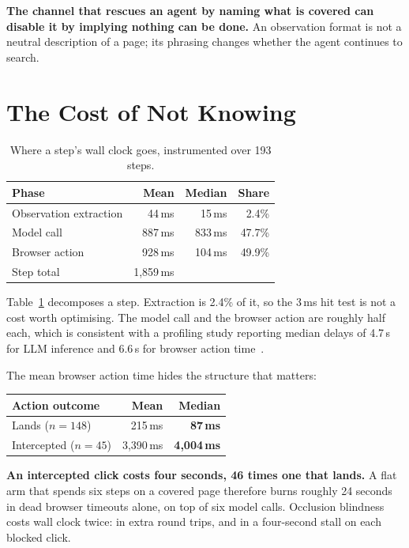 \documentclass[conference]{IEEEtran}
\begin{document}
\textbf{The channel that rescues an agent by naming what is covered can disable
it by implying nothing can be done.} An observation format is not a neutral
description of a page; its phrasing changes whether the agent continues to
search.

\section{The Cost of Not Knowing}
\label{sec:cost}

\begin{table}[t]
\caption{Where a step's wall clock goes, instrumented over 193 steps.}
\label{tab:cost}
\centering
\begin{tabular}{@{}lrrr@{}}
\toprule
Phase & Mean & Median & Share \\
\midrule
Observation extraction & 44\,ms  & 15\,ms  & 2.4\% \\
Model call             & 887\,ms & 833\,ms & 47.7\% \\
Browser action         & 928\,ms & 104\,ms & 49.9\% \\
\midrule
Step total             & 1{,}859\,ms & & \\
\bottomrule
\end{tabular}
\end{table}

Table~\ref{tab:cost} decomposes a step. Extraction is 2.4\% of it, so the
3\,ms hit test is not a cost worth optimising. The model call and the browser
action are roughly half each, which is consistent with a profiling study
reporting median delays of 4.7\,s for LLM inference and 6.6\,s for browser
action time~\cite{skim}.

The mean browser action time hides the structure that matters:

\begin{center}
\begin{tabular}{@{}lrr@{}}
\toprule
Action outcome & Mean & Median \\
\midrule
Lands ($n = 148$)       & 215\,ms   & \textbf{87\,ms} \\
Intercepted ($n = 45$)  & 3{,}390\,ms & \textbf{4{,}004\,ms} \\
\bottomrule
\end{tabular}
\end{center}

\textbf{An intercepted click costs four seconds, 46 times one that lands.} A
flat arm that spends six steps on a covered page therefore burns roughly 24
seconds in dead browser timeouts alone, on top of six model calls. Occlusion
blindness costs wall clock twice: in extra round trips, and in a four-second
stall on each blocked click.
\end{document}
